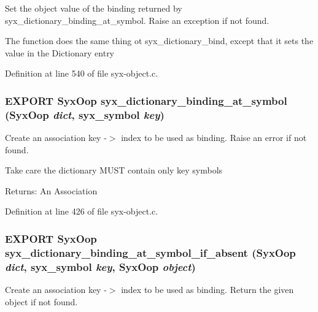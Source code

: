 Set the object value of the binding returned by syx\_\-dictionary\_\-binding\_\-at\_\-symbol. Raise an exception if not found.

The function does the same thing ot syx\_\-dictionary\_\-bind, except that it sets the value in the Dictionary entry 

Definition at line 540 of file syx-object.c.\hypertarget{syx-object_8h_a7e087f1a8becf74a1e37463e3a7c5cc}{
\subsubsection{\setlength{\rightskip}{0pt plus 5cm}EXPORT {\bf SyxOop} syx\_\-dictionary\_\-binding\_\-at\_\-symbol ({\bf SyxOop} {\em dict}, \/  {\bf syx\_\-symbol} {\em key})}}
\label{syx-object_8h_a7e087f1a8becf74a1e37463e3a7c5cc}


Create an association key -$>$ index to be used as binding. Raise an error if not found.

Take care the dictionary MUST contain only key symbols

\begin{Desc}
\item[Returns:]An Association \end{Desc}


Definition at line 426 of file syx-object.c.\hypertarget{syx-object_8h_9712ba3f5f6614d91900aabce7a5ce53}{
\subsubsection{\setlength{\rightskip}{0pt plus 5cm}EXPORT {\bf SyxOop} syx\_\-dictionary\_\-binding\_\-at\_\-symbol\_\-if\_\-absent ({\bf SyxOop} {\em dict}, \/  {\bf syx\_\-symbol} {\em key}, \/  {\bf SyxOop} {\em object})}}
\label{syx-object_8h_9712ba3f5f6614d91900aabce7a5ce53}


Create an association key -$>$ index to be used as binding. Return the given object if not found.

